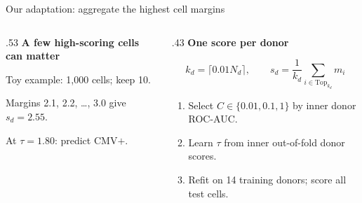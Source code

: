 \documentclass[aspectratio=169,10pt]{beamer}
\newcommand{\eyebrow}[1]{{\color{Teal}\bfseries #1}\par\smallskip}
\begin{document}
\begin{frame}{Our adaptation: aggregate the highest cell margins}
  \begin{columns}[c,onlytextwidth]
    \begin{column}{.53\textwidth}
      \eyebrow{A few high-scoring cells can matter}
      \par\smallskip
      \small Toy example: 1,000 cells; keep 10.\par
      Margins 2.1, 2.2, \ldots, 3.0 give $s_d=2.55$.\par
      At $\tau=1.80$: predict CMV$+$.
    \end{column}
    \begin{column}{.43\textwidth}
      \eyebrow{One score per donor}
      \[k_d=\lceil0.01N_d\rceil,\qquad
        s_d=\frac{1}{k_d}\sum_{i\in\mathrm{Top}_{k_d}}m_i\]
      \begin{enumerate}\setlength\itemsep{3pt}
        \item Select $C\in\{0.01,0.1,1\}$ by inner donor ROC-AUC.
        \item Learn $\tau$ from inner out-of-fold donor scores.
        \item Refit on 14 training donors; score all test cells.
      \end{enumerate}
    \end{column}
  \end{columns}
\end{frame}
\end{document}
